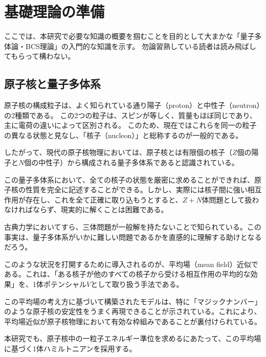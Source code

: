 \documentclass[a4paper]{jsreport}
\begin{document}
  \chapter{基礎理論の準備}
  ここでは、本研究で必要な知識の概要を掴むことを目的として大まかな「量子多体論・BCS理論」の入門的な知識を示す。
  勿論習熟している読者は読み飛ばしてもらって構わない。
  \section{原子核と量子多体系}
    原子核の構成粒子は、よく知られている通り陽子（proton）と中性子（neutron）の2種類である。  
    この2つの粒子は、スピンが等しく、質量もほぼ同じであり、主に電荷の違いによって区別される。  
    このため、現在ではこれらを同一の粒子の異なる状態と見なし、「核子（nucleon）」と総称するのが一般的である。

    したがって、現代の原子核物理においては、原子核とは有限個の核子（$Z$個の陽子と$N$個の中性子）から構成される量子多体系であると認識されている。

    この量子多体系において、全ての核子の状態を厳密に求めることができれば、原子核の性質を完全に記述することができる。しかし、実際には核子間に強い相互作用が存在し、これを全て正確に取り込もうとすると、$Z+N$体問題として扱わなければならず、現実的に解くことは困難である。

    古典力学においてすら、三体問題が一般解を持たないことで知られている。この事実は、量子多体系がいかに難しい問題であるかを直感的に理解する助けとなるだろう。

    このような状況を打開するために導入されるのが、平均場（mean field）近似である。これは、「ある核子が他のすべての核子から受ける相互作用の平均的な効果」を、1体ポテンシャル$V$として取り扱う手法である。

    この平均場の考え方に基づいて構築されたモデルは、特に「マジックナンバー」のような原子核の安定性をうまく再現できることが示されている。これにより、平均場近似が原子核物理において有効な枠組みであることが裏付けられている。

    本研究でも、原子核中の一粒子エネルギー準位を求めるにあたって、この平均場に基づく1体ハミルトニアンを採用する。
\end{document}
